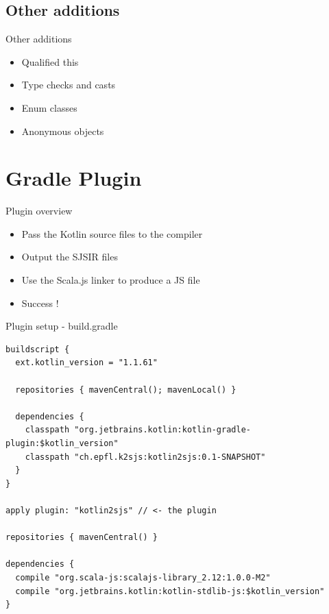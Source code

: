 \documentclass[10pt]{beamer}
\begin{document}
\subsection{Other additions}

\begin{frame}{Other additions}
 \begin{itemize}
  \item Qualified this
  \item Type checks and casts
  \item Enum classes
  \item Anonymous objects
 \end{itemize}

\end{frame}


\section{Gradle Plugin}

\begin{frame}{Plugin overview}
 \begin{itemize}
  \item Pass the Kotlin source files to the compiler
  \item Output the SJSIR files
  \item Use the Scala.js linker to produce a JS file
  \item Success !
 \end{itemize}

\end{frame}


\begin{frame}[fragile]{Plugin setup - build.gradle}
\begin{verbatim}
buildscript {
  ext.kotlin_version = "1.1.61"
    
  repositories { mavenCentral(); mavenLocal() }

  dependencies {
    classpath "org.jetbrains.kotlin:kotlin-gradle-plugin:$kotlin_version"
    classpath "ch.epfl.k2sjs:kotlin2sjs:0.1-SNAPSHOT"
  }
}

apply plugin: "kotlin2sjs" // <- the plugin

repositories { mavenCentral() }

dependencies {  
  compile "org.scala-js:scalajs-library_2.12:1.0.0-M2"
  compile "org.jetbrains.kotlin:kotlin-stdlib-js:$kotlin_version"
}
\end{verbatim}
\end{frame}
\end{document}
